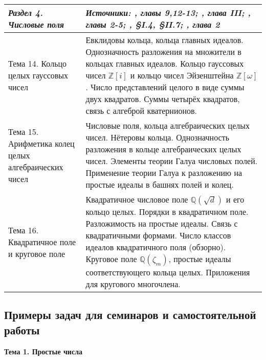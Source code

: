 \documentclass[a4paper, 12pt]{article}
\begin{document}
\begin{longtable}{ | >{\raggedright}p{6cm} | p{9cm} | }
    \textit{Раздел 4. Числовые поля} & \textit{Источники: \cite{IR}, главы 9,12-13; \cite{BSh}, глава III; \cite{Marc}, главы 2-5; \cite{Cox}, \S I.4, \S II.7; \cite{DSV}, глава 2} \\ \hline
    Тема 14. Кольцо целых гауссовых чисел & Евклидовы кольца, кольца главных идеалов. Однозначность разложения на множители в кольцах главных идеалов. Кольцо гауссовых чисел $\mathbb{Z}[i]$ и кольцо чисел Эйзенштейна $\mathbb{Z}[\omega]$. Число представлений целого в виде суммы двух квадратов. Суммы четырёх квадратов, связь с алгеброй кватернионов. \\ \hline
    Тема 15. Арифметика колец целых алгебраических чисел & Числовые поля, кольца алгебраических целых чисел. Нётеровы кольца. Однозначность разложения в кольце алгебраических целых чисел. Элементы теории Галуа числовых полей. Применение теории Галуа к разложению на простые идеалы в башнях полей и колец. \\ \hline
    Тема 16. Квадратичное поле и круговое поле & Квадратичное числовое поле $\mathbb{Q}(\sqrt{d})$ и его кольцо целых. Порядки в квадратичном поле. Разложимость на простые идеалы. Связь с квадратичными формами. Число классов идеалов квадратичного поля (обзорно). Круговое поле $\mathbb{Q}(\zeta_m)$, простые идеалы соответствующего кольца целых. Приложения для кругового многочлена. \\ \hline
    
\end{longtable}

\subsection{Примеры задач для семинаров и самостоятельной работы \label{problems}}

\begin{center} {\bf Тема 1. Простые числа} \end{center}
\end{document}
